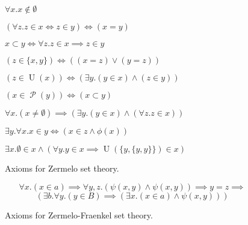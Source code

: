 \begin{figure}
  \begin{axz}\label{axz:empty}
    $\forall x. x \notin \emptyset$
  \end{axz}
  \begin{axz}[extensionality]\label{axz:extensionality}
    $(\forall z. z \in x \iff z \in y) \iff (x = y)$
  \end{axz}
  \begin{axz}[subset]\label{axz:subset}
    $x\subset y \iff \forall z. z \in x \implies z \in y$
  \end{axz}
  \begin{axz}[pair]\label{axz:pair}
    $(z \in \lbrace x, y\rbrace) \iff ((x = z) \lor (y = z))$
  \end{axz}
  \begin{axz}[union]\label{axz:union}
    $(z \in \operatorname{U}(x)) \iff (\exists y. (y \in x) \land (z \in y))$
  \end{axz}
  \begin{axz}[power]\label{axz:power}
    $(x \in \operatorname{\mathcal{P}}(y)) \iff (x \subset y)$
  \end{axz}
  \begin{axz}[foundation]\label{axz:foundation}
    $\forall x. (x \neq \emptyset) \implies (\exists y. (y \in x) \land (\forall z. z \in x))$
  \end{axz}
  \begin{axz}\label{axz:comprehension}
    $\exists y. \forall x. x \in y \iff (x \in z \land \phi(x))$
  \end{axz}
  \begin{axz}[infinity]\label{axz:infinity}
    $\exists x. \emptyset \in x \land (\forall y. y \in x \implies \operatorname{U}(\lbrace y, \lbrace y, y \rbrace \rbrace) \in x)$
  \end{axz}
  \caption{Axioms for Zermelo set theory.}
  \label{fig:axiomsz}
\end{figure}

\begin{figure}
  \begin{axzf}\label{axzf:replacement}
    $$\forall x. (x \in a) \implies \forall y, z.  (\psi(x, y) \land \psi(x, y)) \implies y = z \implies $$
    $$(\exists b. \forall y. (y \in B) \implies (\exists x. (x \in a) \land \psi(x, y)))$$
  \end{axzf}
  \caption{Axioms for Zermelo-Fraenkel set theory.}
  \label{fig:axiomszf}
\end{figure}


